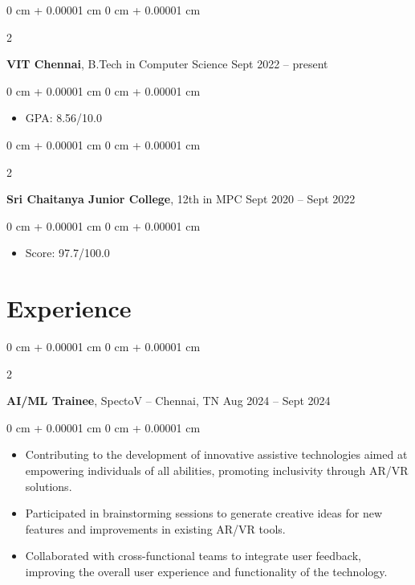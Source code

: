 \documentclass[10pt, letterpaper]{article}
\newenvironment{highlights}{
    \begin{itemize}[
        topsep=0.10 cm,
        parsep=0.10 cm,
        partopsep=0pt,
        itemsep=0pt,
        leftmargin=0 cm + 10pt
    ]
}{
    \end{itemize}
} %
\newenvironment{onecolentry}{
    \begin{adjustwidth}{
        0 cm + 0.00001 cm
    }{
        0 cm + 0.00001 cm
    }
}{
    \end{adjustwidth}
} %
\newenvironment{twocolentry}[2][]{
    \onecolentry
    \def\secondColumn{#2}
    \setcolumnwidth{\fill, 4.5 cm}
    \begin{paracol}{2}
}{
    \switchcolumn \raggedleft \secondColumn
    \end{paracol}
    \endonecolentry
} %
\begin{document}
        
        \begin{twocolentry}{
            Sept 2022 – present
        }
            \textbf{VIT Chennai}, B.Tech in Computer Science\end{twocolentry}

        \vspace{0.10 cm}
        \begin{onecolentry}
            \begin{highlights}
                \item GPA: 8.56/10.0
            \end{highlights}
        \end{onecolentry}
        \begin{twocolentry}{
            Sept 2020 – Sept 2022
        }
            \textbf{Sri Chaitanya Junior College}, 12th in MPC\end{twocolentry}

        \vspace{0.10 cm}
        \begin{onecolentry}
            \begin{highlights}
                \item Score: 97.7/100.0
            \end{highlights}
        \end{onecolentry}
    \section{Experience}        
        \begin{twocolentry}{
            Aug 2024 – Sept 2024
        }
            \textbf{AI/ML Trainee}, SpectoV -- Chennai, TN\end{twocolentry}

        \vspace{0.10 cm}
        \begin{onecolentry}
            \begin{highlights}
                \item Contributing to the development of innovative assistive technologies aimed at empowering individuals of all abilities, promoting inclusivity through AR/VR solutions.
                \item Participated in brainstorming sessions to generate creative ideas for new features and improvements in existing AR/VR tools.
                \item Collaborated with cross-functional teams to integrate user feedback, improving the overall user experience and functionality of the technology.
            \end{highlights}
        \end{onecolentry}
\end{document}
